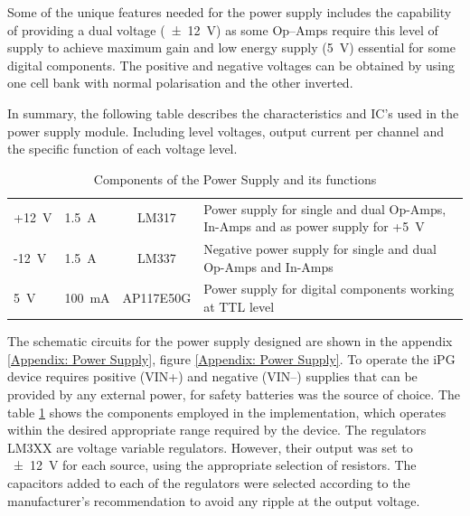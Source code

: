 Some of the unique features needed for the power supply includes the capability of providing a dual voltage (\SI{\pm 12}{\volt}) as some Op–Amps require this level of supply to achieve maximum gain and low energy supply (\SI{5}{\volt}) essential for some digital components. The positive and negative voltages can be obtained by using one cell bank with normal polarisation and the other inverted. 

In summary, the following table describes the characteristics and IC's used in the power supply module. Including level voltages, output current per channel and the specific function of each voltage level. 

\begin{table}[!htpb]
	\caption{Components of the Power Supply and its functions}
	\centering
	\label{table:power supply details}
	\begin{tabular}{p{2 cm} p{2 cm} c p{6 cm}}
		\toprule
		\centering{\textbf{Voltage supply}} & \centering{\textbf{Current supply}} & \centering{\textbf{IC}} & \centering{\textbf{Function}} \tabularnewline \midrule
		+\SI{12}{\volt} & \SI{1.5}{\ampere} & LM317 & Power supply for single and dual Op-Amps, In-Amps and as power supply for +\SI{5}{\volt} \tabularnewline \midrule 
		-\SI{12}{\volt} & \SI{1.5}{\ampere} & LM337 & Negative power supply for single and dual Op-Amps and In-Amps \tabularnewline \midrule 
		\SI{5}{\volt} & \SI{100}{\milli\ampere} & AP117E50G & Power supply for digital components working at TTL level \tabularnewline \bottomrule 
	\end{tabular}
\end{table}

The schematic circuits for the power supply designed are shown in the appendix \ref{Appendix: Power Supply}, figure \ref{Appendix: Power Supply}. To operate the iPG device requires positive (VIN+) and negative (VIN–) supplies that can be provided by any external power, for safety batteries was the source of choice. The table \ref{table:power supply details} shows the components employed in the implementation, which operates within the desired appropriate range required by the device. The regulators LM3XX are voltage variable regulators. However, their output was set to \SI{\pm 12}{\volt} for each source, using the appropriate selection of resistors. The capacitors added to each of the regulators were selected according to the manufacturer’s recommendation to avoid any ripple at the output voltage.


